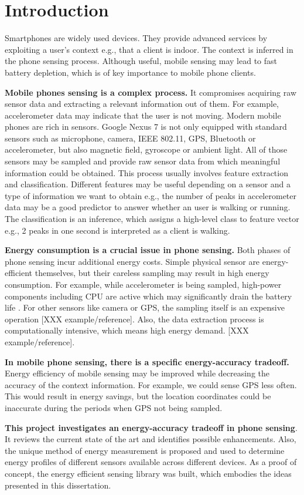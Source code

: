 \section{Introduction}
\label{s:intro}
\hspace{10pt} Smartphones are widely used devices. They provide advanced services by exploiting a user's context e.g., that a client is indoor. The context is inferred in the phone sensing process. Although useful, mobile sensing may lead to fast battery depletion, which is of key importance to mobile phone clients. 

\textbf{Mobile phones sensing is a complex process.} It compromises acquiring raw sensor data and extracting a relevant information out of them. For example, accelerometer data may indicate that the user is not moving. Modern mobile phones are rich in sensors. Google Nexus 7 is not only equipped with standard sensors such as microphone, camera, IEEE 802.11, GPS, Bluetooth or accelerometer, but also magnetic field, gyroscope or ambient light. All of those sensors may be sampled and provide raw sensor data from which meaningful information could be obtained. This process usually involves feature extraction and classification. Different features may be useful depending on a sensor and a type of information we want to obtain e.g., the number of peaks in accelerometer data may be a good predictor to answer whether an user is walking or running. The classification is an inference, which assigns a high-level class to feature vector e.g., 2 peaks in one second is interpreted as a client is walking.

\textbf{Energy consumption is a crucial issue in phone sensing.} Both phases of phone sensing incur additional energy costs. Simple physical sensor are energy-efficient themselves, but their careless sampling may result in high energy consumption. For example, while accelerometer is being sampled, high-power components including CPU are active which may significantly drain the battery life \cite{priyantha:littlerock}. For other sensors like camera or GPS, the sampling itself is an expensive operation [XXX example/reference]. Also, the data extraction process is computationally intensive, which means high energy demand. [XXX example/reference]. 

\textbf{In mobile phone sensing, there is a specific energy-accuracy tradeoff.} Energy efficiency of mobile sensing may be improved while decreasing the accuracy of the context information. For example, we could sense GPS less often. This would result in energy savings, but the location coordinates could be inaccurate during the periods when GPS not being sampled.

\textbf{This project investigates an energy-accuracy tradeoff in phone sensing}. It reviews the current state of the art and identifies possible enhancements. Also, the unique method of energy measurement is proposed and used to determine energy profiles of different sensors available across different devices. As a proof of concept, the energy efficient sensing library was built, which embodies the ideas presented in this dissertation.
